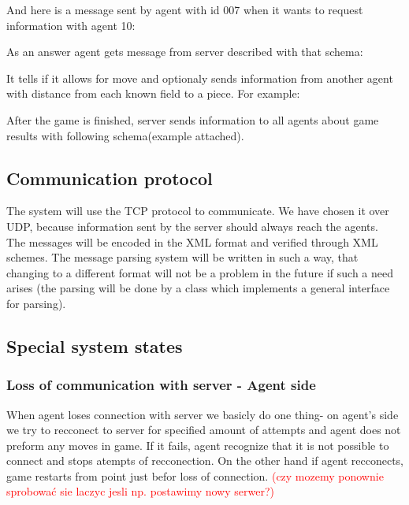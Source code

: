 \documentclass[11pt,a4paper]{article}
\begin{document}
And here is a message sent by agent with id 007 when it wants to request information with agent 10: 


As an answer agent gets message from server described with that schema:

It tells if it allows for move and optionaly sends information from another agent with distance from each known field to a piece.
For example:


After the game is finished, server sends information to all agents about game results with following schema(example attached).



\subsection{Communication protocol}

The system will use the TCP protocol to communicate. We have chosen it over UDP, because information sent by the server should always reach the agents. \\
The messages will be encoded in the XML format and verified through XML schemes. The message parsing system will be written in such a way, that changing to a different format will not be a problem in the future if such a need arises (the parsing will be done by a class which implements a general interface for parsing).

\subsection{Special system states}

\subsubsection{Loss of communication with server - Agent side}
When agent loses connection with server we basicly do one thing- on agent's side we try to recconect to server for specified amount of attempts and agent does not preform any moves in game. If it fails, agent recognize that it is not possible to connect and stops atempts of recconection. On the other hand if agent recconects, game restarts from point just befor loss of connection. \textcolor{red}{(czy mozemy ponownie sprobować sie laczyc jesli np. postawimy nowy serwer?)}
\end{document}

